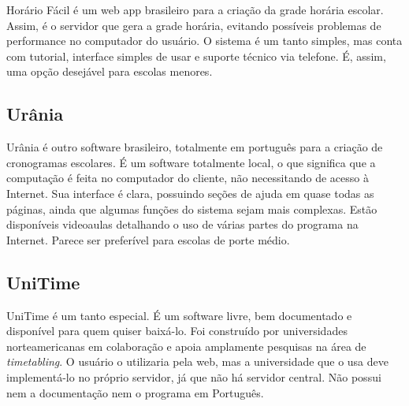 \documentclass[12pt,a4paper]{article}
\begin{document}
			\par Horário Fácil é um web app brasileiro para a criação da grade horária escolar. Assim, é o servidor que gera a grade horária, evitando possíveis problemas de performance no computador do usuário. O sistema é um tanto simples, mas conta com tutorial, interface simples de usar e suporte técnico via telefone. É, assim, uma opção desejável para escolas menores.


		\subsection{Urânia}

			\par Urânia é outro software brasileiro, totalmente em português para a criação de cronogramas escolares. É um software totalmente local, o que significa que a computação é feita no computador do cliente, não necessitando de acesso à Internet. Sua interface é clara, possuindo seções de ajuda em quase todas as páginas, ainda que algumas funções do sistema sejam mais complexas. Estão disponíveis videoaulas detalhando o uso de várias partes do programa na Internet. Parece ser preferível para escolas de porte médio.

		\subsection{UniTime}

			\par UniTime é um tanto especial. É um software livre, bem documentado e disponível para quem quiser baixá-lo. Foi construído por universidades norteamericanas em colaboração e apoia amplamente pesquisas na área de \textit{timetabling}. O usuário o utilizaria pela web, mas a universidade que o usa deve implementá-lo no próprio servidor, já que não há servidor central. Não possui nem a documentação nem o programa em Português.

		\vspace{1cm}
\end{document}
